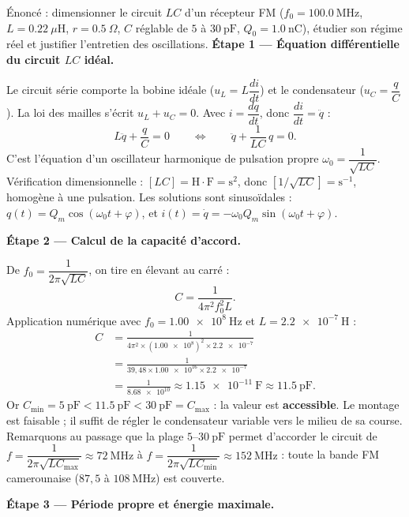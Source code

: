 \documentclass[11pt]{article}
\newcommand{\cle}[1]{{\popxbold\color{popdark}#1}}
\begin{document}
\begin{exoresolu}
Énoncé : dimensionner le circuit $LC$ d'un récepteur FM ($f_0 = \num{100,0}~\text{MHz}$, $L = \num{0,22}~\mu\text{H}$, $r = \num{0,5}~\Omega$, $C$ réglable de $5$ à $30~\text{pF}$, $Q_0 = \num{1,0}~\text{nC}$), étudier son régime réel et justifier l'entretien des oscillations.
\tcblower
\textbf{Étape 1 — Équation différentielle du circuit $LC$ idéal.}

Le circuit série comporte la bobine idéale ($u_L = L\dfrac{di}{dt}$) et le condensateur ($u_C = \dfrac{q}{C}$). La loi des mailles s'écrit $u_L + u_C = 0$. Avec $i = \dfrac{dq}{dt}$, donc $\dfrac{di}{dt} = \ddot{q}$ :
\[
L\ddot{q} + \frac{q}{C} = 0
\qquad\Longleftrightarrow\qquad
\ddot{q} + \frac{1}{LC}\,q = 0.
\]
C'est l'équation d'un \cle{oscillateur harmonique} de pulsation propre $\omega_0 = \dfrac{1}{\sqrt{LC}}$. Vérification dimensionnelle : $[LC] = \text{H}\cdot\text{F} = \text{s}^2$, donc $[1/\sqrt{LC}] = \text{s}^{-1}$, homogène à une pulsation. Les solutions sont sinusoïdales : $q(t) = Q_m\cos(\omega_0 t + \varphi)$, et $i(t) = \dot{q} = -\omega_0 Q_m\sin(\omega_0 t + \varphi)$.

\textbf{Étape 2 — Calcul de la capacité d'accord.}

De $f_0 = \dfrac{1}{2\pi\sqrt{LC}}$, on tire en élevant au carré :
\[
C = \frac{1}{4\pi^2 f_0^2 L}.
\]
Application numérique avec $f_0 = \num{1,00e8}~\text{Hz}$ et $L = \num{2,2e-7}~\text{H}$ :
\begin{align*}
C &= \frac{1}{4\pi^2 \times (\num{1,00e8})^2 \times \num{2,2e-7}} \\
&= \frac{1}{39{,}48 \times \num{1,00e16} \times \num{2,2e-7}} \\
&= \frac{1}{\num{8,68e10}} \approx \num{1,15e-11}~\text{F} \approx \num{11,5}~\text{pF}.
\end{align*}
Or $C_{\min} = \num{5}~\text{pF} < \num{11,5}~\text{pF} < \num{30}~\text{pF} = C_{\max}$ : la valeur est \textbf{accessible}. Le montage est faisable ; il suffit de régler le condensateur variable vers le milieu de sa course. Remarquons au passage que la plage $5$--$30~\text{pF}$ permet d'accorder le circuit de $f = \dfrac{1}{2\pi\sqrt{LC_{\max}}} \approx \num{72}~\text{MHz}$ à $f = \dfrac{1}{2\pi\sqrt{LC_{\min}}} \approx \num{152}~\text{MHz}$ : toute la bande FM camerounaise ($87{,}5$ à $108~\text{MHz}$) est couverte.

\textbf{Étape 3 — Période propre et énergie maximale.}


\end{exoresolu}
\end{document}
